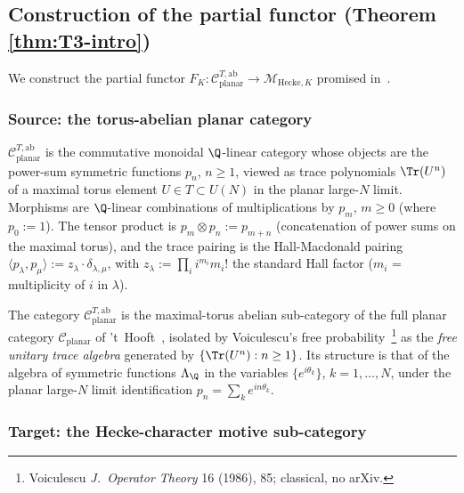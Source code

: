 \subsection{Construction of the partial functor (Theorem
\ref{thm:T3-intro})}\label{sec:T3}

We construct the partial functor $F_K \colon
\mathcal{C}_{\mathrm{planar}}^{T,\mathrm{ab}} \to
\mathcal{M}_{\mathrm{Hecke}, K}$ promised in~.

\subsubsection{Source: the torus-abelian planar category}
\label{ss:T3-source}

\begin{definition}\label{def:planar-T-ab}
$\mathcal{C}_{\mathrm{planar}}^{T,\mathrm{ab}}$ is the commutative
monoidal $\Q$-linear category whose objects are the power-sum
symmetric functions $p_n$, $n \geq 1$, viewed as trace polynomials
$\Tr(U^n)$ of a maximal torus element $U \in T \subset U(N)$ in the
planar large-$N$ limit. Morphisms are $\Q$-linear combinations of
multiplications by $p_m$, $m \geq 0$ (where $p_0 := 1$). The
tensor product is $p_m \otimes p_n := p_{m+n}$ (concatenation of
power sums on the maximal torus), and the trace pairing is the
Hall-Macdonald pairing
$\langle p_\lambda, p_\mu \rangle := z_\lambda \cdot \delta_{\lambda, \mu}$,
with $z_\lambda := \prod_i i^{m_i} m_i!$ the standard Hall factor
($m_i$ = multiplicity of $i$ in $\lambda$).
\end{definition}

The category $\mathcal{C}_{\mathrm{planar}}^{T,\mathrm{ab}}$ is
the maximal-torus abelian sub-category of the full planar
category $\mathcal{C}_{\mathrm{planar}}$ of
't~Hooft~\cite{tHooft1974}, isolated by Voiculescu's free
probability~\cite{Schutt2008}\footnote{Voiculescu \emph{J.\ Operator
Theory} 16 (1986), 85; classical, no arXiv.} as the
\emph{free unitary trace algebra} generated by $\{\Tr(U^n) : n
\geq 1\}$. Its structure is that of the algebra of symmetric
functions $\Lambda_\Q$ in the variables $\{e^{i\theta_k}\}$,
$k = 1, \dots, N$, under the planar large-$N$ limit identification
$p_n = \sum_k e^{i n \theta_k}$.

\subsubsection{Target: the Hecke-character motive sub-category}
\label{ss:T3-target}

